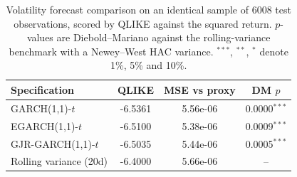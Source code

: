 \begin{table}[htbp]
\centering
\caption{Volatility forecast comparison on an identical sample of 6008 test observations, scored by QLIKE against the squared return. $p$-values are Diebold--Mariano against the rolling-variance benchmark with a Newey--West HAC variance. $^{***}$, $^{**}$, $^{*}$ denote 1\%, 5\% and 10\%.}
\label{tab:volatility}
\begin{tabular}{l S[table-format=-1.4] S[table-format=1.2e-1] c}
\toprule
Specification & {QLIKE} & {MSE vs proxy} & {DM $p$} \\
\midrule
GARCH(1,1)-$t$ & -6.5361 & 5.56e-06 & 0.0000$^{***}$ \\
EGARCH(1,1)-$t$ & -6.5100 & 5.38e-06 & 0.0009$^{***}$ \\
GJR-GARCH(1,1)-$t$ & -6.5035 & 5.44e-06 & 0.0005$^{***}$ \\
Rolling variance (20d) & -6.4000 & 5.66e-06 & -- \\
\bottomrule
\end{tabular}
\end{table}
